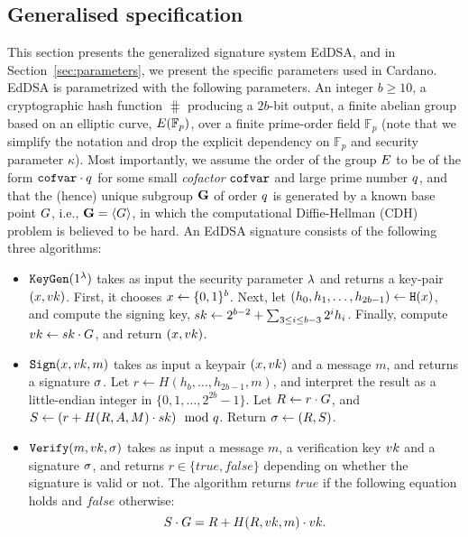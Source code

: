 \subsection{Generalised specification}
This section presents the generalized signature system EdDSA, and in Section~\ref{sec:parameters}, we present the specific parameters used in Cardano. EdDSA is parametrized with the following parameters. An integer $b\geq 10$, a cryptographic hash function $\hash$ producing a $2b$-bit output, a finite abelian group based on an elliptic curve, $E(\mathbb{F}_p)$, over a finite prime-order field $\mathbb{F}_p$ (note that we simplify the notation and drop the explicit dependency on $\mathbb{F}_p$ and security parameter $\kappa$). Most importantly, we assume the order of the group $E$ to be of the form $\texttt{cofvar}\cdot q$ for some small \emph{cofactor} $\texttt{cofvar}$ and large prime number $q$, and that the (hence) unique subgroup $\mathbf{G}$ of order $q$ is generated by a known base point $G$, i.e., $\mathbf{G} = \langle G\rangle$,  in which the computational Diffie-Hellman (CDH) problem is believed to be hard. An EdDSA signature consists of the following three algorithms:
\begin{itemize}
\item $\texttt{KeyGen}(1^\lambda)$ takes as input the security parameter $\lambda$ and returns a key-pair $(x, vk)$. First, it chooses $x\leftarrow\{0,1\}^b$. Next, let $(h_0, h_1, \ldots, h_{2b - 1})\gets\texttt{H}(x)$, and compute the signing key, $sk \gets 2^{b-2} + \sum_{3\leq i\leq b-3}2^i h_i$. Finally, compute $vk \gets sk \cdot G$, and return $(x, vk)$.
\item $\texttt{Sign}(x, vk, m)$ takes as input a keypair $(x, vk)$ and a message $m$, and returns a signature $\sigma$. Let $r \gets H(h_b, \ldots, h_{2b-1}, m)$, and interpret the result as a little-endian integer in $\{0,1,\ldots, 2^{2b}-1\}$. Let $R \gets r\cdot G$, and $S \gets (r + H(R, A, M)\cdot sk) \mod {q}$. Return $\sigma \gets (R, S)$.
\item $\texttt{Verify}(m, vk, \sigma)$ takes as input a message $m$, a verification key $vk$ and a signature $\sigma$, and returns $r\in\{true, false\}$ depending on whether the signature is valid or not. The algorithm returns $true$ if the following equation holds and $false$ otherwise:
\[S\cdot G = R + H(R, vk, m)\cdot vk.\]
\end{itemize}

